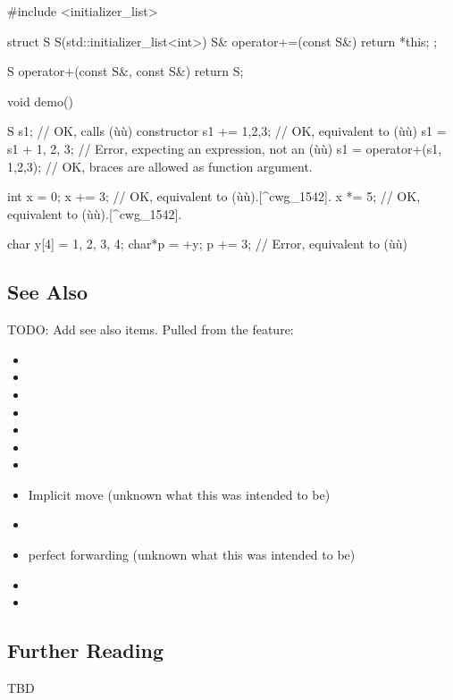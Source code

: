 \begin{emcppslisting}
#include <initializer_list>

struct S
{
    S(std::initializer_list<int>) { }
    S& operator+=(const S&) { return *this; }
};

S operator+(const S&, const S&) { return S{}; }

void demo()
{
    S s1{};               // OK, calls (ù{}ù) constructor
    s1 += {1,2,3};        // OK, equivalent to (ù{}ù)
    s1 = s1 + {1, 2, 3};  // Error, expecting an expression, not an (ù{}ù)
    s1 = operator+(s1, {1,2,3}); // OK, braces are allowed as function argument.

    int x = 0;
    x += {3};    // OK, equivalent to (ù{}ù).[^cwg_1542].
    x *= {5};    // OK, equivalent to (ù{}ù).[^cwg_1542].

    char y[4] = {1, 2, 3, 4};
    char*p = +y;
    p += {3};    // Error,  equivalent to (ù{}ù)
}
\end{emcppslisting}


\subsection[See Also]{See Also}\label{see-also}

TODO: Add see also items. Pulled from the feature:
\begin{itemize}
\item{}
\item{}
\item{}
\item{}
\item{}
\item{}
\item{}
\item{Implicit move (unknown what this was intended to be)}
\item{}
\item{perfect forwarding (unknown what this was intended to be) }
\item{}
\item{}
\end{itemize}

\subsection[Further Reading]{Further Reading}\label{further-reading}

TBD


